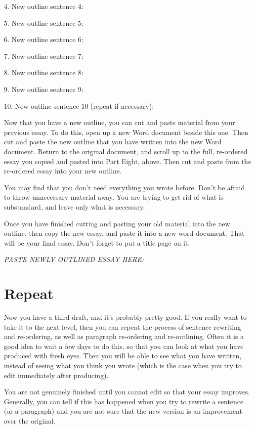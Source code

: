 \documentclass{article}
\begin{document}
4. New outline sentence 4:

5. New outline sentence 5:

6. New outline sentence 6:

7. New outline sentence 7:

8. New outline sentence 8:

9. New outline sentence 9:

10. New outline sentence 10 (repeat if necessary):

Now that you have a new outline, you can cut and paste material from
your previous essay. To do this, open up a new Word document beside this
one. Then cut and paste the new outline that you have written into the
new Word document. Return to the original document, and scroll up to the
full, re-ordered essay you copied and pasted into Part Eight, above.
Then cut and paste from the re-ordered essay into your new outline.

You may find that you don't need everything you wrote before. Don't be
afraid to throw unnecessary material away. You are trying to get rid of
what is substandard, and leave only what is necessary.

Once you have finished cutting and pasting your old material into the
new outline, then copy the new essay, and paste it into a new word
document. That will be your final essay. Don't forget to put a title
page on it.

\emph{PASTE NEWLY OUTLINED ESSAY HERE:}

\section{Repeat}

Now you have a third draft, and it's probably pretty good. If you really
want to take it to the next level, then you can repeat the process of
sentence rewriting and re-ordering, as well as paragraph re-ordering and
re-outlining. Often it is a good idea to wait a few days to do this, so
that you can look at what you have produced with fresh eyes. Then you
will be able to see what you have written, instead of seeing what you
think you wrote (which is the case when you try to edit immediately
after producing).

You are not genuinely finished until you cannot edit so that your essay
improves. Generally, you can tell if this has happened when you try to
rewrite a sentence (or a paragraph) and you are not sure that the new
version is an improvement over the original.
\end{document}

